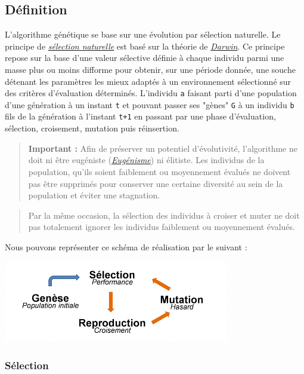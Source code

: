 \hypertarget{duxe9finition}{%
\subsection{Définition}\label{duxe9finition}}

L'algorithme génétique se base sur une évolution par sélection
naturelle. Le principe de
\emph{\href{https://fr.wikipedia.org/wiki/S\%C3\%A9lection_naturelle}{sélection
naturelle}} est basé sur la théorie de
\emph{\href{https://fr.wikipedia.org/wiki/Charles_Darwin}{Darwin}}. Ce
principe repose sur la base d'une valeur sélective définie à chaque
individu parmi une masse plus ou moins difforme pour obtenir, sur une
période donnée, une souche détenant les paramètres les mieux adaptés à
un environnement sélectionné sur des critères d'évaluation déterminés.
L'individu \texttt{a} faisant parti d'une population d'une génération à
un instant \texttt{t} et pouvant passer ses "gènes" \texttt{G} à un
individu \texttt{b} fils de la génération à l'instant \texttt{t+1} en
passant par une phase d'évaluation, sélection, croisement, mutation puis
réinsertion.

\begin{quote}
\textbf{Important :} Afin de préserver un potentiel d'évolutivité,
l'algorithme ne doit ni être eugéniste
(\emph{\href{https://fr.wikipedia.org/wiki/Eug\%C3\%A9nisme}{Eugénisme}})
ni élitiste. Les individus de la population, qu'ils soient faiblement ou
moyennement évalués ne doivent pas être supprimés pour conserver une
certaine diversité au sein de la population et éviter une stagnation.
\end{quote}

\begin{quote}
Par la même occasion, la sélection des individus à croiser et muter ne
doit pas totalement ignorer les individus faiblement ou moyennement
évalués.
\end{quote}

Nous pouvons représenter ce schéma de réalisation par le suivant :

\includegraphics{.ressources/algo_gen_scheme.png}

\hypertarget{suxe9lection}{%
\subsubsection{Sélection}\label{suxe9lection}}

